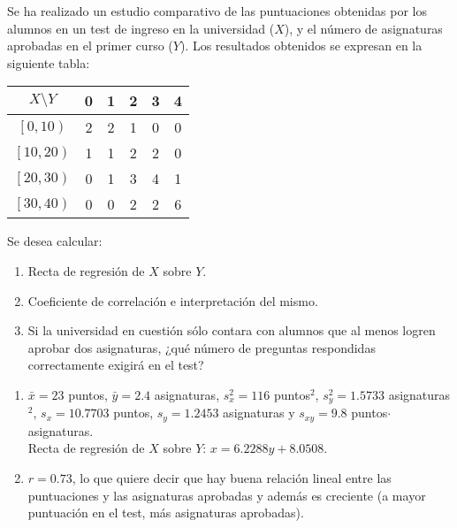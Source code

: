 {Se ha realizado un estudio comparativo de las puntuaciones obtenidas por los alumnos en un test de ingreso en la
universidad ($X$), y el número de asignaturas aprobadas en el primer curso ($Y$). Los resultados obtenidos se expresan en
la siguiente tabla:

\begin{center}
\begin{tabular}{|c||c|c|c|c|c|}
\hline
$X\setminus Y$ & 0 & 1 & 2 & 3 & 4 \\ \hline\hline
$\left[ 0,10\right) $ & 2 & 2 & 1 & 0 & 0 \\ \hline
$\left[ 10,20\right) $ & 1 & 1 & 2 & 2 & 0 \\ \hline
$\left[ 20,30\right) $ & 0 & 1 & 3 & 4 & 1 \\ \hline
$\left[ 30,40\right) $ & 0 & 0 & 2 & 2 & 6 \\ \hline
\end{tabular}
\end{center}

Se desea calcular:
\begin{enumerate}
\item Recta de regresión de $X$ sobre $Y.$
\item Coeficiente de correlación e interpretación del mismo.
\item Si la universidad en cuestión sólo contara con alumnos que al menos logren aprobar dos asignaturas, ¿qué número
de preguntas respondidas correctamente exigirá en el test?
\end{enumerate}
}
{
\begin{enumerate}
\item $\bar x=23$ puntos, $\bar y=2.4$ asignaturas, $s_x^2=116$ puntos$^2$, $s_y^2=1.5733$ asignaturas$^2$,
$s_x=10.7703$ puntos, $s_y=1.2453$ asignaturas y $s_{xy}=9.8$ puntos$\cdot$asignaturas.\\
Recta de regresión de $X$ sobre $Y$: $x=6.2288y+8.0508$.
\item $r=0.73$, lo que quiere decir que hay buena relación lineal entre las puntuaciones y las asignaturas aprobadas y
además es creciente (a mayor puntuación en el test, más asignaturas aprobadas).
\end{enumerate}
}
{}


